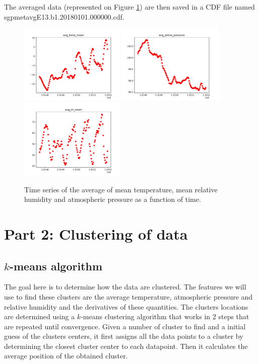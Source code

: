 \documentclass[11pt]{amsart}
\begin{document}
The averaged data (represented on Figure \ref{fig:ts-avg}) are then saved in a CDF file named sgpmetavgE13.b1.20180101.000000.cdf.
\begin{figure}
    \includegraphics[width=0.45\textwidth]{../plots/avg_temp_mean.pdf}
    \includegraphics[width=0.45\textwidth]{../plots/avg_atmos_pressure.pdf}
    \includegraphics[width=0.45\textwidth]{../plots/avg_rh_mean.pdf}
    \caption{\label{fig:ts-avg}Time series of the average of mean temperature, mean relative humidity and atmospheric pressure as a function of time.}
\end{figure}

\section{Part 2: Clustering of data}

\subsection{$k$-means algorithm}
The goal here is to determine how the data are clustered.
The features we will use to find these clusters are the average temperature, atmospheric pressure and relative humidity and the derivatives of these quantities.
The clusters locations are determined using a $k$-means clustering algorithm that works in 2 steps that are repeated until convergence.
Given a number of cluster to find and a initial guess of the clusters centers, it first assigns all the data points to a cluster by determining the closest cluster center to each datapoint.
Then it calculates the average position of the obtained cluster.
\end{document}
